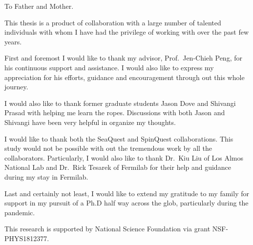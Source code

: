 \documentclass[../main.tex]{subfiles}
\begin{document}
\begin{dedication}
	To Father and Mother.
\end{dedication}

\begin{acknowledgments}
	This thesis is a product of collaboration with a large number of talented
	individuals with whom I have had the privilege of working with over the past
	few years.

	First and foremost I would like to thank my advisor, Prof.\ Jen-Chieh Peng, for
	his continuous support and assistance. I would also like to express my
	appreciation for his efforts, guidance and encouragement through out this whole
	journey.

	I would also like to thank former graduate students Jason Dove and Shivangi
	Prasad with helping me learn the ropes. Discussions with both Jason and
	Shivangi have been very helpful in organize my thoughts.

	I would like to thank both the SeaQuest and SpinQuest collaborations.
	This study would not be possible with out the tremendous work by all the
	collaborators. Particularly, I would also like to thank Dr.\ Kiu Liu of Los Almos
	National Lab and Dr.\ Rick Tesarek of Fermilab for their help and guidance during
	my stay in Fermilab.

	Last and certainly not least, I would like to extend my gratitude to my family
	for support in my pursuit of a Ph.D half way across the glob, particularly
	during the pandemic.

	This research is supported by National Science Foundation via grant NSF-PHYS1812377.

\end{acknowledgments}
\end{document}
